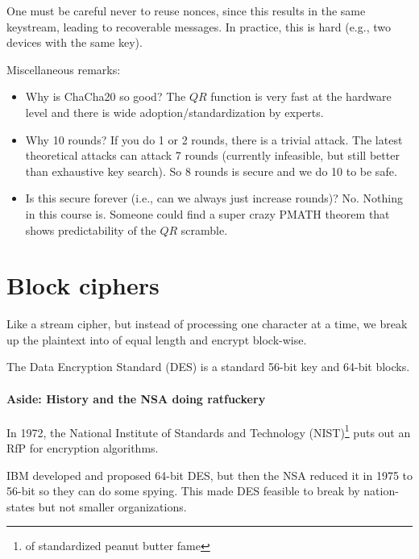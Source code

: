 \documentclass[class=co487,tikz,minted,notes]{agony}
\begin{document}
One must be careful never to reuse nonces, since this results in the same keystream,
leading to recoverable messages.
In practice, this is hard (e.g., two devices with the same key).

Miscellaneous remarks:
\begin{itemize}[nosep]
  \item Why is ChaCha20 so good? The $QR$ function is very fast at the hardware level
        and there is wide adoption/standardization by experts.
  \item Why 10 rounds? If you do 1 or 2 rounds, there is a trivial attack.
        The latest theoretical attacks can attack 7 rounds
        (currently infeasible, but still better than exhaustive key search).
        So 8 rounds is secure and we do 10 to be safe.
  \item Is this secure forever (i.e., can we always just increase rounds)?
        No. Nothing in this course is.
        Someone could find a super crazy PMATH theorem that shows
        predictability of the $QR$ scramble.
\end{itemize}

\section{Block ciphers}

\begin{defn}
  Like a stream cipher, but instead of processing one character at a time,
  we break up the plaintext into  of equal length
  and encrypt block-wise.
\end{defn}

\begin{example}
  The Data Encryption Standard (DES) is a standard
  56-bit key and 64-bit blocks.
\end{example}

\paragraph{Aside: History and the NSA doing ratfuckery}
In 1972, the National Institute of Standards and Technology (NIST)\footnote{of standardized peanut butter fame}
puts out an RfP for encryption algorithms.

IBM developed and proposed 64-bit DES, but then the NSA reduced it in 1975
to 56-bit so they can do some spying.
This made DES feasible to break by nation-states but not smaller organizations.
\end{document}
